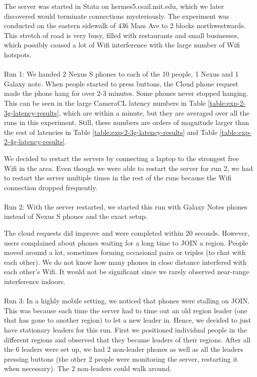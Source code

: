 The server was started in Stata on hermes5.csail.mit.edu, which we later discovered would terminate connections mysteriously. The experiment was conducted on the eastern sidewalk of 436 Mass Ave to 2 blocks northwestwards. This stretch of road is very busy, filled with restaurants and small businesses, which possibly caused a lot of Wifi interference with the large number of Wifi hotspots.
\\
\\
Run 1:
We handed 2 Nexus S phones to each of the 10 people, 1 Nexus and 1 Galaxy note. When people started to press buttons, the Cloud phone request made the phone hang for over 2-3 minutes. Some phones never stopped hanging. This can be seen in the large CameraCL latency numbers in Table \ref{table:exp-2-3g-latency-results}, which are within a minute, but they are averaged over all the runs in this experiment. Still, these numbers are orders of magnitude larger than the rest of latencies in Table \ref{table:exp-2-3g-latency-results} and Table \ref{table:exp-2-4g-latency-results}. 

We decided to restart the servers by connecting a laptop to the strongest free Wifi in the area. Even though we were able to restart the server for run 2, we had to restart the server multiple times in the rest of the runs because the Wifi connection dropped frequently.
\\
\\
Run 2:
With the server restarted, we started this run with Galaxy Notes phones instead of Nexus S phones and the exact setup.

The cloud requests did improve and were completed within 20 seconds. However, users complained about phones waiting for a long time to JOIN a region.  People moved around a lot, sometimes forming occasional pairs or triples (to chat with each other). We do not know how many phones in close distance interfered with each other's Wifi. It would not be significant since we rarely observed near-range interference indoors. 
\\
\\
Run 3:
In a highly mobile setting, we noticed that phones were stalling on JOIN. This was because each time the server had to time out an old region leader (one that has gone to another region) to let a new leader in. Hence, we decided to just have stationary leaders for this run. First we positioned individual people in the different regions and observed that they became leaders of their regions. After all the 6 leaders were set up, we had 2 non-leader phones as well as all the leaders pressing buttons (the other 2 people were monitoring the server, restarting it when necessary). The 2 non-leaders could walk around. 


